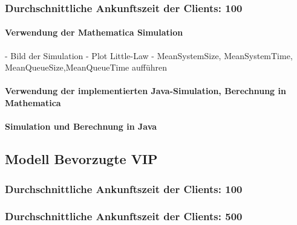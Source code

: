 \subsubsection{Durchschnittliche Ankunftszeit der Clients: 100}
\paragraph{Verwendung der Mathematica Simulation}
- Bild der Simulation 
- Plot Little-Law
- MeanSystemSize, MeanSystemTime, MeanQueueSize,MeanQueueTime aufführen

\paragraph{Verwendung der implementierten Java-Simulation, Berechnung in Mathematica}


%
%
  
\paragraph{Simulation und Berechnung in Java}




\subsection{Modell \glqq Bevorzugte VIP\grqq} 
\subsubsection{Durchschnittliche Ankunftszeit der Clients: 100}
\subsubsection{Durchschnittliche Ankunftszeit der Clients: 500}
